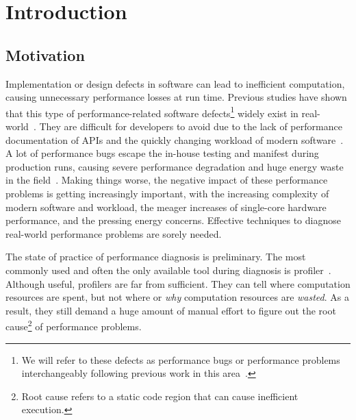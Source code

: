 \section{Introduction}



\subsection{Motivation}


Implementation or design defects in software can lead to inefficient 
computation, causing unnecessary performance losses at run time.
Previous studies have shown that this type of performance-related software
defects\footnote{We will refer to these defects as performance bugs
or performance problems interchangeably following previous work in this 
area~\citep{PerfBug,Alabama,perf.fse10}.} 
widely exist in real-world~\citep{s2e,PerfBug,perf.fse10,rily.perftest,perfantipattern}.
They are difficult for developers to avoid due to the lack of 
performance documentation of APIs and the quickly changing workload of
modern software~\citep{PerfBug}.
A lot of performance bugs escape the in-house testing and manifest during
production runs, causing severe performance degradation and huge energy 
waste in the field~\citep{PerfBug}. Making things worse, the negative impact of 
these performance problems is getting increasingly important,
with the increasing complexity of modern software and workload,
the meager increases of single-core hardware performance, and the 
pressing energy concerns.
Effective techniques to diagnose real-world performance problems 
are sorely needed.



The state of practice of performance diagnosis is preliminary.
The most commonly used and often the only available tool during
diagnosis is profiler~\citep{oprofile,gprof}. 
Although useful, profilers are far from sufficient.
They can tell where
computation resources are spent, but not where or \textit{why} computation 
resources are 
\textit{wasted}.
As a result, they still demand a huge amount of manual effort to figure
out the root cause\footnote{%
Root cause refers to a static code
region that can cause inefficient execution.} of performance problems.

